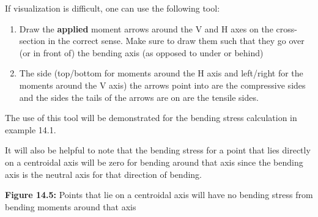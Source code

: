 \documentclass[
  letterpaper,
  DIV=11,
  numbers=noendperiod]{scrreprt}
\providecommand{\tightlist}{%
  \setlength{\itemsep}{0pt}\setlength{\parskip}{0pt}}\usepackage{longtable,booktabs,array}
\begin{document}
If visualization is difficult, one can use the following tool:

\begin{enumerate}
\def\labelenumi{\arabic{enumi}.}
\tightlist
\item
  Draw the \textbf{applied} moment arrows around the V and H axes on the
  cross-section in the correct sense. Make sure to draw them such that
  they go over (or in front of) the bending axis (as opposed to under or
  behind)
\item
  The side (top/bottom for moments around the H axis and left/right for
  the moments around the V axis) the arrows point into are the
  compressive sides and the sides the tails of the arrows are on are the
  tensile sides.
\end{enumerate}

The use of this tool will be demonstrated for the bending stress
calculation in example 14.1.

It will also be helpful to note that the bending stress for a point that
lies directly on a centroidal axis will be zero for bending around that
axis since the bending axis is the neutral axis for that direction of
bending.

\textbf{Figure 14.5:} Points that lie on a centroidal axis will have no
bending stress from bending moments around that axis
\end{document}
